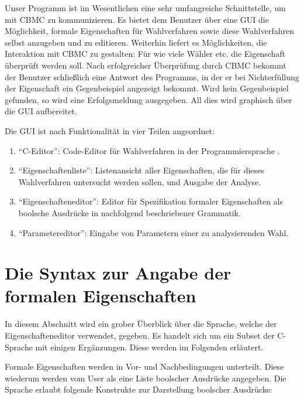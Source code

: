 \documentclass[a4paper]{scrreprt}
\begin{document}
Unser Programm ist im Wesentlichen eine sehr umfangreiche Schnittstelle, um mit \ac{CBMC} zu kommunizieren. Es bietet dem \gls{Benutzer} über eine \ac{GUI} die Möglichkeit, formale Eigenschaften für Wahlverfahren sowie diese Wahlverfahren selbst anzugeben und zu editieren. Weiterhin liefert es Möglichkeiten, die Interaktion mit \ac{CBMC} zu gestalten: Für wie viele Wähler etc. die Eigenschaft überprüft werden soll. Nach erfolgreicher Überprüfung durch \ac{CBMC} bekommt der \gls{Benutzer} schließlich eine Antwort des Programms, in der er bei Nichterfüllung der Eigenschaft ein Gegenbeispiel angezeigt bekommt. Wird kein Gegenbeispiel gefunden, so wird eine Erfolgsmeldung ausgegeben. All dies wird graphisch über die \ac{GUI} aufbereitet.

Die \ac{GUI} ist nach Funktionalität in vier Teilen angeordnet:
\begin{enumerate}
\item "`C-Editor"': Code-Editor für Wahlverfahren in der Programmiersprache .
\item "`Eigenschaftenliste"': Listenansicht aller Eigenschaften, die für dieses Wahlverfahren untersucht werden sollen, und Ausgabe der Analyse.
\item "`Eigenschafteneditor"': Editor für Spezifikation formaler Eigenschaften als boolsche Ausdrücke in nachfolgend beschriebener Grammatik.
\item "`Parametereditor"': Eingabe von Parametern einer zu analysierenden Wahl.
\end{enumerate}

\section{Die Syntax zur Angabe der formalen Eigenschaften} \label{Sprache-für-formale-Eigenschaften}
In diesem Abschnitt wird ein grober Überblick über die Sprache, welche der Eigenschafteneditor verwendet, gegeben. Es handelt sich um ein \gls{Subset} der C-Sprache mit einigen Ergänzungen. Diese werden im Folgenden erläutert. 

Formale Eigenschaften werden in Vor- und Nachbedingungen unterteilt. Diese wiederum werden vom User als eine Liste boolscher Ausdrücke angegeben. Die Sprache erlaubt folgende Konstrukte zur Darstellung boolscher Ausdrücke:
\end{document}
